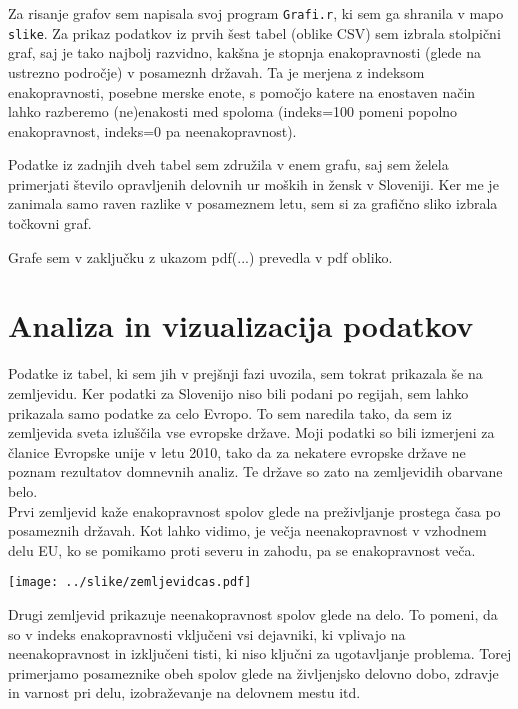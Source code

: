 \documentclass[11pt,a4paper]{article}
\begin{document}
Za risanje grafov sem napisala svoj program \verb-Grafi.r-, ki sem ga shranila v mapo \verb-slike-.
Za prikaz podatkov iz prvih šest tabel (oblike CSV) sem izbrala stolpični graf, saj je tako najbolj razvidno, kakšna je stopnja enakopravnosti (glede na ustrezno področje) v posameznh  državah. Ta je merjena z indeksom enakopravnosti, posebne merske enote, s pomočjo katere na enostaven način lahko razberemo (ne)enakosti med spoloma (indeks=100 pomeni popolno enakopravnost, indeks=0 pa neenakopravnost).

Podatke iz zadnjih dveh tabel sem združila v enem grafu, saj sem želela primerjati število opravljenih delovnih ur moških in žensk v Sloveniji. Ker me je zanimala samo raven razlike v posameznem letu, sem si za grafično sliko izbrala točkovni graf.

Grafe sem v zaključku z ukazom pdf(...) prevedla v pdf obliko.



\section{Analiza in vizualizacija podatkov}

Podatke iz tabel, ki sem jih v prejšnji fazi uvozila, sem tokrat prikazala še na zemljevidu.
Ker podatki za Slovenijo niso bili podani po regijah, sem lahko prikazala samo podatke za celo Evropo. To sem naredila tako, da sem iz zemljevida sveta izluščila vse evropske države. Moji podatki so bili izmerjeni za članice Evropske unije v letu 2010, tako da za nekatere evropske države ne poznam rezultatov domnevnih analiz. Te države so zato na zemljevidih obarvane belo.\\
\vspace{5mm}
Prvi zemljevid kaže enakopravnost spolov glede na preživljanje prostega časa po posameznih državah. Kot lahko vidimo, je večja neenakopravnost v vzhodnem delu EU, ko se pomikamo proti severu in zahodu, pa se enakopravnost veča.

\texttt{[image: ../slike/zemljevidcas.pdf]}

\newpage
Drugi zemljevid prikazuje neenakopravnost spolov glede na delo. To pomeni, da so v indeks enakopravnosti vključeni vsi dejavniki, ki vplivajo na neenakopravnost in izključeni tisti, ki niso ključni za ugotavljanje problema. Torej primerjamo posameznike obeh spolov glede na
življenjsko delovno dobo, zdravje in varnost pri delu, izobraževanje na delovnem mestu itd.
\end{document}
